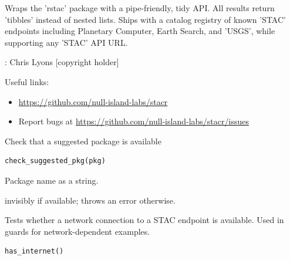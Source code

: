 \documentclass[a4paper]{book}
\begin{document}
%
\begin{Description}
Wraps the 'rstac' package with a pipe-friendly, tidy API. All results return 'tibbles' instead of nested lists. Ships with a catalog registry of known 'STAC' endpoints including Planetary Computer, Earth Search, and 'USGS', while supporting any 'STAC' API URL.
\end{Description}
%
\begin{Author}
: Chris Lyons  [copyright holder]

\end{Author}
%
\begin{SeeAlso}
Useful links:
\begin{itemize}

\item{} \url{https://github.com/null-island-labs/stacr}
\item{} Report bugs at \url{https://github.com/null-island-labs/stacr/issues}

\end{itemize}


\end{SeeAlso}
%
\begin{Description}
Check that a suggested package is available
\end{Description}
%
\begin{Usage}
\begin{verbatim}
check_suggested_pkg(pkg)
\end{verbatim}
\end{Usage}
%
\begin{Arguments}
\begin{ldescription}
\item[\code{pkg}] Package name as a string.
\end{ldescription}
\end{Arguments}
%
\begin{Value}
 invisibly if available; throws an error otherwise.
\end{Value}
%
\begin{Description}
Tests whether a network connection to a STAC endpoint is available.
Used in  guards for network-dependent examples.
\end{Description}
%
\begin{Usage}
\begin{verbatim}
has_internet()
\end{verbatim}
\end{Usage}
\end{document}
